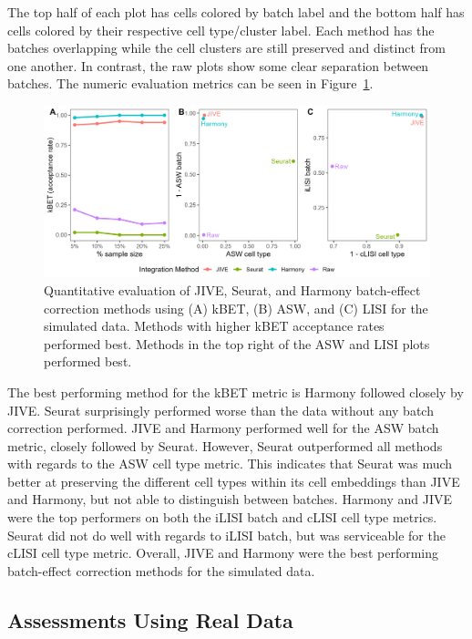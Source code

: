 \documentclass[unnumsec,webpdf,contemporary,large]{oup-authoring-template}%
\theoremstyle{thmstyleone}%
\theoremstyle{thmstyletwo}%
\theoremstyle{thmstylethree}%
\begin{document}
The top half of each plot has cells colored by batch label and the bottom half has cells colored by their respective cell type/cluster label. Each method has the batches overlapping while the cell clusters are still preserved and distinct from one another. In contrast, the raw plots show some clear separation between batches. The numeric evaluation metrics can be seen in Figure~\ref{fig:metrics_simdata}.

\begin{figure}[ht]
        \centering 
        \includegraphics[width=1\columnwidth]{metrics_simdata} 
        \caption[Metrics for Simulated Data]{Quantitative evaluation of JIVE, Seurat, and Harmony batch-effect correction methods using (A) kBET, (B) ASW, and (C) LISI for the simulated data. Methods with higher kBET acceptance rates performed best. Methods in the top right of the ASW and LISI plots performed best.}
        \label{fig:metrics_simdata} 
\end{figure}

The best performing method for the kBET metric is Harmony followed closely by JIVE. Seurat surprisingly performed worse than the data without any batch correction performed. JIVE and Harmony performed well for the ASW batch metric, closely followed by Seurat. However, Seurat outperformed all methods with regards to the ASW cell type metric. This indicates that Seurat was much better at preserving the different cell types within its cell embeddings than JIVE and Harmony, but not able to distinguish between batches. Harmony and JIVE were the top performers on both the iLISI batch and cLISI cell type metrics. Seurat did not do well with regards to iLISI batch, but was serviceable for the cLISI cell type metric. Overall, JIVE and Harmony were the best performing batch-effect correction methods for the simulated data.

\subsection{Assessments Using Real Data}
\end{document}
